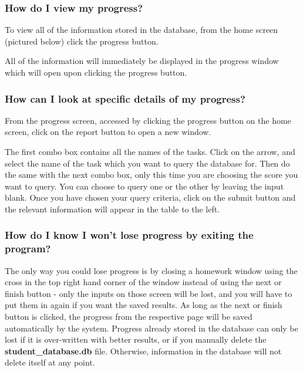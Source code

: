 
\subsubsection{How do I view my progress?}

To view all of the information stored in the database, from the home screen (pictured below) click the progress button.


All of the information will immediately be displayed in the progress window which will open upon clicking the progress button.


\subsubsection{How can I look at specific details of my progress?}

From the progress screen, accessed by clicking the progress button on the home screen, click on the report button to open a new window.


The first combo box contains all the names of the tasks. Click on the arrow, and select the name of the task which you want to query the database for. Then do the same with the next combo box, only this time you are choosing the score you want to query. You can choose to query one or the other by leaving the input blank. Once you have chosen your query criteria, click on the submit button and the relevant information will appear in the table to the left.


\subsubsection{How do I know I won't lose progress by exiting the program?}

The only way you could lose progress is by closing a homework window using the cross in the top right hand corner of the window instead of using the next or finish button - only the inputs on those screen will be lost, and you will have to put them in again if you want the saved results. As long as the next or finish button is clicked, the progress from the respective page will be saved automatically by the system. Progress already stored in the database can only be lost if it is over-written with better results, or if you manually delete the \textbf{student\_database.db} file. Otherwise, information in the database will not delete itself at any point.

